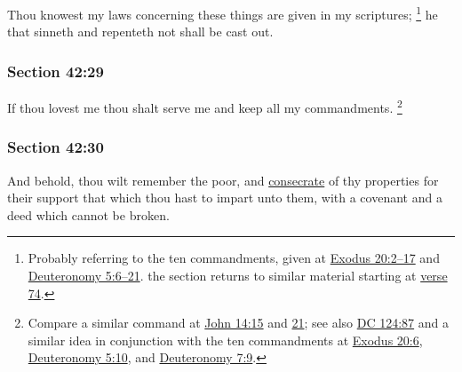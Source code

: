 		Thou knowest my laws concerning these things are given in my scriptures;%
			\footnote{%
				Probably referring to the ten commandments, given at \hyperref[EXODUS-20-2]{Exodus 20:2--17} and \hyperref[DEUTERONOMY-5-6]{Deuteronomy 5:6--21}. the section returns to similar material starting at \hyperref[DC42-74]{verse 74}.
				} 
		he that sinneth and repenteth not shall be cast out.


	\subsubsection{Section 42:29} %
		\label{DC42-29}

		If thou lovest me thou shalt serve me and keep all my commandments.%
			\footnote{%
				Compare a similar command at \hyperref[JOHN-14-15]{John 14:15} and \hyperref[JOHN-14-21]{21}; see also \hyperref[DC124-87]{DC 124:87} and a similar idea in conjunction with the ten commandments at \hyperref[EXODUS-20-6]{Exodus 20:6}, \hyperref[DEUTERONOMY-5-10]{Deuteronomy 5:10}, and \hyperref[DEUTERONOMY-7-9]{Deuteronomy 7:9}.
				}


	\subsubsection{Section 42:30} %
		\label{DC42-30}

		And behold, thou wilt remember the poor, and \hyperref[CONSECRATION]{consecrate} of thy properties for their support that which thou hast to impart unto them, with a covenant and a deed which cannot be broken.

